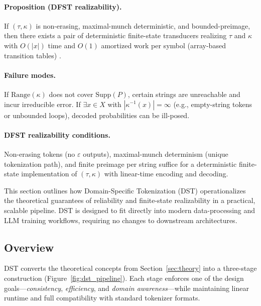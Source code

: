 \paragraph{Proposition (DFST realizability).}
If $(\tau,\kappa)$ is non-erasing, maximal-munch deterministic, and bounded-preimage, then there exists a pair of deterministic finite-state transducers realizing $\tau$ and $\kappa$ with $O(|x|)$ time and $O(1)$ amortized work per symbol (array-based transition tables) \citep{Mohri2004FST, Roark2011GrammarTokenization}.

\paragraph{Failure modes.}
If $\mathrm{Range}(\kappa)$ does not cover $\mathrm{Supp}(P)$, certain strings are unreachable and incur irreducible error. If $\exists x\in X$ with $|\kappa^{-1}(x)|=\infty$ (e.g., empty-string tokens or unbounded loops), decoded probabilities can be ill-posed.

\paragraph{DFST realizability conditions.}
Non-erasing tokens (no $\varepsilon$ outputs), maximal-munch determinism (unique tokenization path), and finite preimage per string suffice for a deterministic finite-state implementation of $(\tau,\kappa)$ with linear-time encoding and decoding.

This section outlines how Domain-Specific Tokenization (DST) operationalizes the theoretical guarantees of reliability and finite-state realizability in a practical, scalable pipeline.
DST is designed to fit directly into modern data-processing and LLM training workflows, requiring no changes to downstream architectures.

\subsection{Overview}

DST converts the theoretical concepts from Section~\ref{sec:theory} into a three-stage construction (Figure~\ref{fig:dst_pipeline}).
Each stage enforces one of the design goals—\emph{consistency}, \emph{efficiency}, and \emph{domain awareness}—while maintaining linear runtime and full compatibility with standard tokenizer formats.

